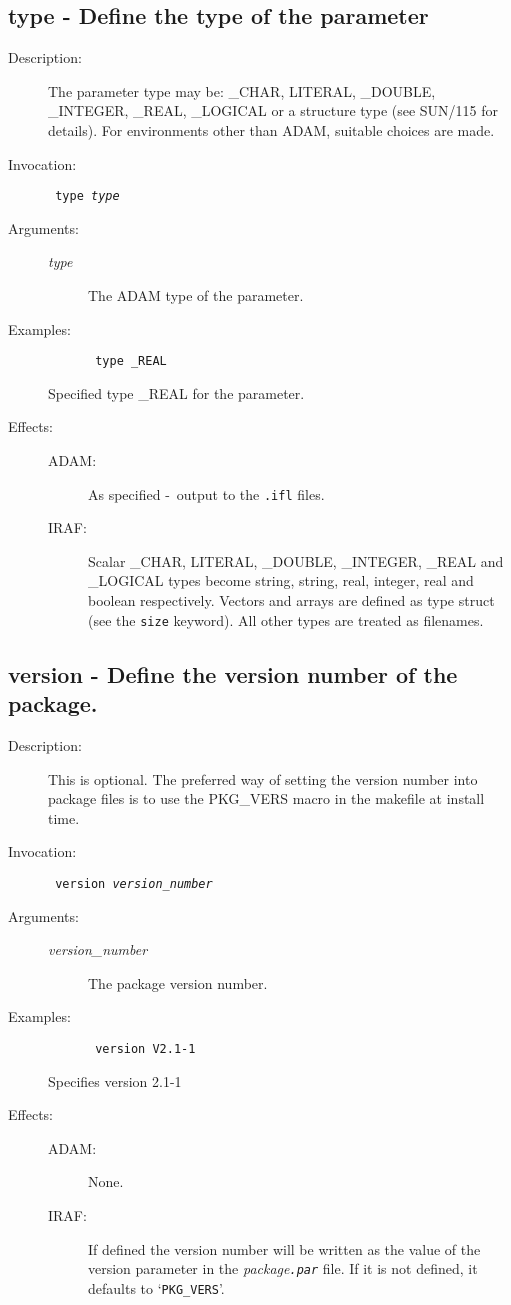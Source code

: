 \documentclass[twoside,11pt]{article}
\newcommand{\htmlref}[2]{#1}
\newcommand{\xref}[3]{#1}
\newcommand{\xlabel}[1]{}
\newcommand{\dash}{--}
\renewcommand{\dash}{-}
\newlength{\sstbannerlength}
\newlength{\sstcaptionlength}
\newlength{\sstexampleslength}
\newlength{\sstexampleswidth}
\newcommand{\sstroutine}[3]{
   \goodbreak
   \rule{\textwidth}{0.5mm}
   \vspace{-7ex}
   \newline
   \settowidth{\sstbannerlength}{{\Large {\bf #1}}}
   \setlength{\sstcaptionlength}{\textwidth}
   \setlength{\sstexampleslength}{\textwidth}
   \addtolength{\sstbannerlength}{0.5em}
   \addtolength{\sstcaptionlength}{-2.0\sstbannerlength}
   \addtolength{\sstcaptionlength}{-5.0pt}
   \settowidth{\sstexampleswidth}{{\bf Examples:}}
   \addtolength{\sstexampleslength}{-\sstexampleswidth}
   \parbox[t]{\sstbannerlength}{\flushleft{\Large {\bf #1}}}
   \parbox[t]{\sstcaptionlength}{\center{\Large #2}}
   \parbox[t]{\sstbannerlength}{\flushright{\Large {\bf #1}}}
   \begin{description}
      #3
   \end{description}
}
\newcommand{\sstdescription}[1]{\item[Description:] #1}
\newcommand{\sstinvocation}[1]{\item[Invocation:]\hspace{0.4em}{\tt #1}}
\newcommand{\ssteffects}[1]{
   \item[Effects:] \mbox{} \\
   \vspace{-3.5ex}
   \begin{description}
      #1
   \end{description}
}
\newcommand{\sstarguments}[1]{
   \item[Arguments:] \mbox{} \\
   \vspace{-3.5ex}
   \begin{description}
      #1
   \end{description}
}
\newcommand{\sstexamples}[1]{
   \item[Examples:] \mbox{}
      #1
}
\newcommand{\sstsubsection}[1]{ \item[{#1}] \mbox{} \\}
\newcommand{\sstexamplesubsection}[2]
{   \vspace{-5ex}
\begin{quote} \texttt{\begin{tabbing}
xxx\=xxx\=\kill
#1
\end{tabbing}}
\end{quote}
#2}
\newcommand{\ssttt}{\tt}
\renewcommand{\sstroutine}[3]{
      \subsection{#1\xlabel{#1}-\label{#1}#2}
      \begin{description}
         #3
      \end{description}
   }
\renewcommand{\sstdescription}[1]{\item[Description:]
      \begin{description}
         #1
      \end{description}
   }
\renewcommand{\sstinvocation}[1]{\item[Invocation:]
      \begin{description}
         {\ssttt #1}
      \end{description}
   }
\renewcommand{\ssteffects}[1]{
      \item[Effects:]
      \begin{description}
         #1
      \end{description}
   }
\renewcommand{\sstarguments}[1]{
      \item[Arguments:]
      \begin{description}
         #1
      \end{description}
   }
\renewcommand{\sstexamples}[1]{
      \item[Examples:]
      \begin{description}
         #1
      \end{description}
   }
\renewcommand{\sstsubsection}[1]{\item[{#1}]}
\renewcommand{\sstexamplesubsection}[2]{\item[] {\ssttt #1} \\ \item[#2]}
\begin{document}
\sstroutine{
   type
}{
   Define the type of the parameter
}{
   \sstdescription{
      The parameter type may be: \_CHAR, LITERAL, \_DOUBLE, \_INTEGER, \_REAL, 
      \_LOGICAL or a structure type (see 
      \xref{SUN/115}{sun115}{}
      for details). For environments other than ADAM, suitable choices are made.
   }
   \sstinvocation{
      type \textit{type}
   }
   \sstarguments{
      \sstsubsection{
         \textit{type}
      }{
         The ADAM type of the parameter.
      }
   }
   \sstexamples{
      \sstexamplesubsection{
         type \_REAL
      }{
         Specified type \_REAL for the parameter.
      }
   }
   \ssteffects{
      \sstsubsection{ADAM:}{As specified \dash\ output to the {\ssttt .ifl} 
                            files.}
      \sstsubsection{IRAF:}{ Scalar \_CHAR, LITERAL, \_DOUBLE, \_INTEGER,
         \_REAL and \_LOGICAL types become string, string, real, integer, real
         and boolean respectively. Vectors and arrays are defined as type 
         struct (see the 
\htmlref{{\ssttt size}}{size}
         keyword). All other types are treated as filenames.}
   }
}

\sstroutine{
   version
}{
   Define the version number of the package.
}{
   \sstdescription{
      This is optional. The preferred way of setting the version number into
      package files is to use the PKG\_VERS macro in the makefile at install
      time.
   }
   \sstinvocation{
      version \textit{version\_number}
   }
   \sstarguments{
      \sstsubsection{
         \textit{version\_number}
      }{
         The package version number.
      }
   }
   \sstexamples{
      \sstexamplesubsection{
         version V2.1-1
      }{
         Specifies version 2.1-1
      }
   }
   \ssteffects{
      \sstsubsection{ADAM:}{None.}
      \sstsubsection{IRAF:}{If defined the version number will be written as
      the value of the version parameter in the \textit{package\texttt{.par}}
      file. If it is not defined, it defaults to `\texttt{PKG\_VERS}'.}
   }
}
\end{document}

